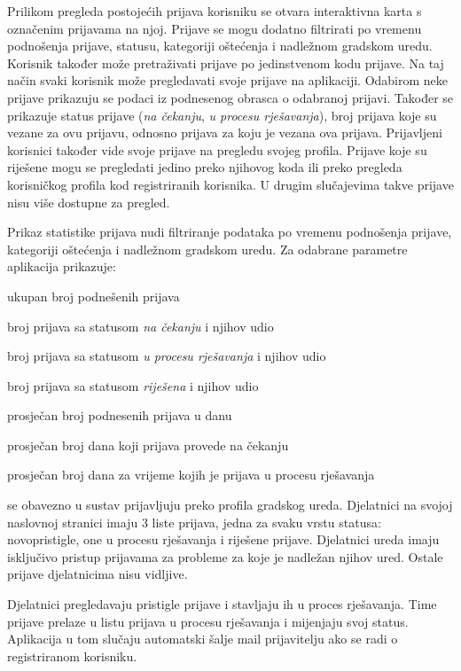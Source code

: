 		Prilikom pregleda postojećih prijava korisniku se otvara interaktivna karta s označenim prijavama na njoj. Prijave se mogu dodatno filtrirati po vremenu podnošenja prijave, statusu, kategoriji oštećenja i nadležnom gradskom uredu. Korisnik također može pretraživati prijave po jedinstvenom kodu prijave. Na taj način svaki korisnik može pregledavati svoje prijave na aplikaciji. Odabirom neke prijave prikazuju se podaci iz podnesenog obrasca o odabranoj prijavi. Također se prikazuje status prijave (\textit{na čekanju}, \textit{u procesu rješavanja}), broj prijava koje su vezane za ovu prijavu, odnosno prijava za koju je vezana ova prijava. Prijavljeni korisnici također vide svoje prijave na pregledu svojeg profila. Prijave koje su riješene mogu se pregledati jedino preko njihovog koda ili preko pregleda korisničkog profila kod registriranih korisnika. U drugim slučajevima takve prijave nisu više dostupne za pregled.
		
		Prikaz statistike prijava nudi filtriranje podataka po vremenu podnošenja prijave, kategoriji oštećenja i nadležnom gradskom uredu. Za odabrane parametre aplikacija prikazuje:
		\begin{packed_item}
			\item ukupan broj podnešenih prijava
			\item broj prijava sa statusom \textit{na čekanju} i njihov udio
			\item broj prijava sa statusom \textit{u procesu rješavanja} i njihov udio
			\item broj prijava sa statusom \textit{riješena} i njihov udio
			\item prosječan broj podnesenih prijava u danu
			\item prosječan broj dana koji prijava provede na čekanju
			\item prosječan broj dana za vrijeme kojih je prijava u procesu rješavanja
		\end{packed_item}
		
		 se obavezno u sustav prijavljuju preko profila gradskog ureda. Djelatnici na svojoj naslovnoj stranici imaju 3 liste prijava, jedna za svaku vrstu statusa: novopristigle, one u procesu rješavanja i riješene prijave. Djelatnici ureda imaju isključivo pristup prijavama za probleme za koje je nadležan njihov ured. Ostale prijave djelatnicima nisu vidljive.
		
		Djelatnici pregledavaju pristigle prijave i stavljaju ih u proces rješavanja. Time prijave prelaze u listu prijava u procesu rješavanja i mijenjaju svoj status. Aplikacija u tom slučaju automatski šalje mail prijavitelju ako se radi o registriranom korisniku.
		
